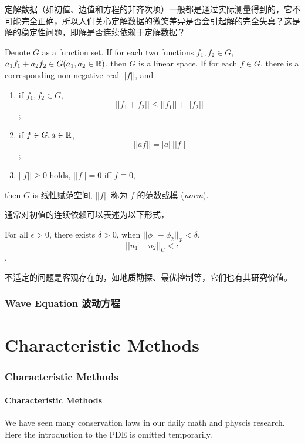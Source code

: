 定解数据（如初值、边值和方程的非齐次项）一般都是通过实际测量得到的，它不可能完全正确，所以人们关心定解数据的微笑差异是否会引起解的完全失真？这是解的稳定性问题，即解是否连续依赖于定解数据？

\begin{definition}
Denote $G$ as a function set. If for each two functions $f_1,f_2\in G$, $a_1 f_1+a_2 f_2\in G (a_1,a_2\in {\mathbb{R}})$, then $G$ is a linear space. If for each $f\in G$, there is a corresponding non-negative real $||f||$, and 
\begin{enumerate}
	\item if $f_1,f_2\in G$, $$||f_1+f_2||\leq ||f_1||+||f_2||$$;
	\item if $f\in G, a\in {\mathbb{R}}$, $$||af||=|a|~ ||f||$$;
	\item $||f||\geq 0$ holds, $||f||=0$ iff $f\equiv 0$,
\end{enumerate} 
then $G$ is 线性赋范空间, $||f||$ 称为 $f$ 的范数或模 (\textit{norm}).
\end{definition}

通常对初值的连续依赖可以表述为以下形式，

For all $\epsilon>0$, there exists $\delta>0$, when $||\phi_1-\phi_2||_\Phi<\delta$, $$||u_1-u_2||_U<\epsilon$$.



不适定的问题是客观存在的，如地质勘探、最优控制等，它们也有其研究价值。

\section{Wave Equation 波动方程}


\part{Characteristic Methods}


\section{Characteristic Methods}
\subsection{Characteristic Methods}
We have seen many conservation laws in our daily math and physcis research. Here the introduction to the PDE is omitted temporarily.
